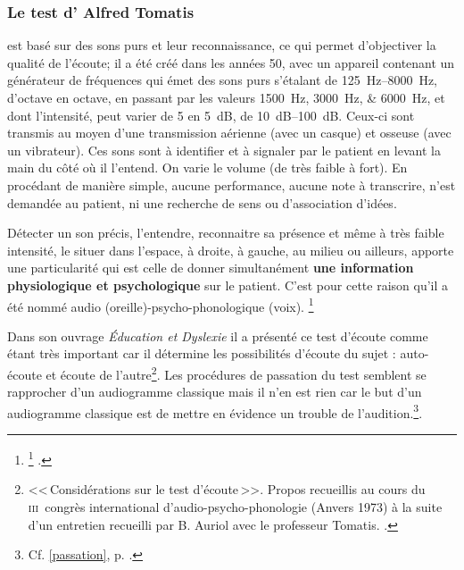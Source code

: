 
\subsubsection{ 
Le test d' Alfred Tomatis}


est basé sur des sons purs et leur
 reconnaissance, ce qui permet d'objectiver la qualité de l'écoute; il a été créé dans les années 50, avec un
  appareil contenant un générateur de fréquences qui émet des sons
  purs s'étalant de \SIrange{125}{8000}{\Hz}, d'octave en octave, en passant par les valeurs
\SIlist{1500;3000;6000}{\Hz}, et dont l'intensité, peut varier de 5 en \SI{5}{\dB}, de \SIrange{10}{100}{\dB}. 
Ceux-ci sont transmis au moyen d'une
  transmission aérienne (avec un casque) et osseuse (avec un vibrateur). Ces sons sont à identifier et à
  signaler par le patient en levant la main du côté où il l'entend. On
  varie le volume (de très faible à fort). En procédant de manière
  simple, aucune performance, aucune note à transcrire, n'est demandée
  au patient, ni une 
  recherche de sens ou d'association d'idées.
 
 Détecter un son précis, l'entendre, reconnaitre sa présence et même à très
 faible intensité, le situer dans l'espace, à droite, à gauche, au
 milieu ou ailleurs,  apporte une particularité qui est celle de  donner simultanément  \textbf{une information
   physiologique et psychologique} sur le patient.
 C'est pour cette raison qu'il a été nommé
 audio (oreille)-psycho-phonologique (voix). \footnote{\footnote{Avec le professeur Tomatis: formation suivie dès 1995, Boulevard de Courcelles, Centre de l'écoute 
Tomatis à Paris; puis en 2009/11/13/15 avec V. Gas, V. Drouot et J.P. Granier, formateurs et consultants. Source: site internet officiel: \cite{tomatis.com}.}
.}
  
  Dans son ouvrage \emph{Éducation et
    Dyslexie}\autocite{tomatis:education} il
  a présenté ce test d'écoute comme étant très important car il détermine les
  possibilités d'écoute du sujet : auto-écoute et écoute de
  l'autre\footnote{<<\,Considérations sur le test d'écoute\,>>. Propos
  	recueillis au cours du \textsc{iii}\ieme\ congrès international
  	d'audio-psycho-phonologie (Anvers 1973) à la suite d'un entretien recueilli par B. Auriol
  	avec le professeur Tomatis. \autocite{auriol_stress}.}. 
   Les procédures de passation du test semblent
  se rapprocher d'un audiogramme classique mais il n'en est rien car
  le but d'un audiogramme classique  est de mettre en évidence un
  trouble de l'audition.\footnote{Cf. \ref{passation}, p. 
    \pageref{passation}.}.
  

